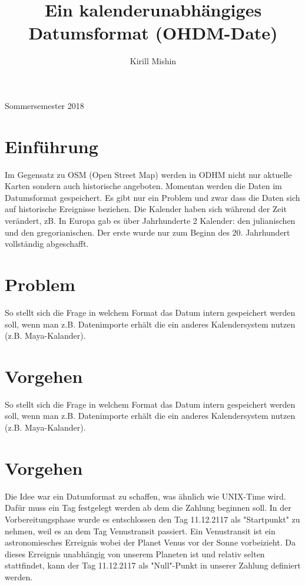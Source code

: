 \documentclass[]{article}
\title{Ein kalenderunabhängiges Datumsformat (OHDM-Date)}
\author{Kirill Mishin}
\begin{document}
\maketitle 

\begin{center}
	Sommersemester 2018
\end{center}

\section{Einführung}
Im Gegensatz zu OSM (Open Street Map) werden in ODHM nicht nur aktuelle Karten sondern auch historische angeboten. Momentan werden die Daten im Datumsformat gespeichert. Es gibt nur ein Problem und zwar dass die Daten sich auf historische Ereignisse beziehen. Die Kalender haben sich während der Zeit verändert, zB. In Europa gab es über Jahrhunderte 2 Kalender: den julianischen und den gregorianischen. Der erste wurde nur zum Beginn des 20. Jahrhundert vollständig abgeschafft.


\section{Problem}
So stellt sich die Frage in welchem Format das Datum intern gespeichert werden soll, wenn man z.B. Datenimporte erhält die ein anderes Kalendersystem nutzen (z.B. Maya-Kalander).


\section{Vorgehen}
So stellt sich die Frage in welchem Format das Datum intern gespeichert werden soll, wenn man z.B. Datenimporte erhält die ein anderes Kalendersystem nutzen (z.B. Maya-Kalander).


\section{Vorgehen}
Die Idee war ein Datumformat zu schaffen, was ähnlich wie UNIX-Time wird. Dafür muss ein Tag festgelegt werden ab dem die Zahlung beginnen soll. In der Vorbereitungsphase wurde es entschlossen den Tag 11.12.2117 als "Startpunkt" zu nehmen, weil es an dem Tag Venustransit passiert. Ein Venustransit ist ein astronomiesches Erreignis wobei der Planet Venus vor der Sonne vorbeizieht. Da dieses Erreignis unabhängig von unserem Planeten ist und relativ selten stattfindet, kann der Tag 11.12.2117 als "Null"-Punkt in unserer Zahlung definiert werden. \newline
\end{document}
